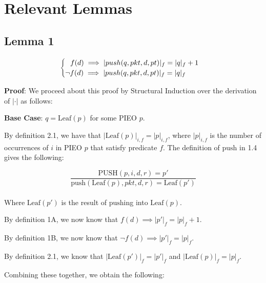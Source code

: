 \documentclass{amsart}
\begin{document}
\section{Relevant Lemmas}

\subsection{Lemma 1}


$$\begin{cases}
    \hspace{0.25cm} \text{$f(d) \implies |push(q, pkt, d, pt)|_f = |q|_f + 1$}\\
    \text{$\neg f(d) \implies |push(q, pkt, d, pt)|_f = |q|_f$}
\end{cases}$$

\textbf{Proof}: We proceed about this proof by Structural Induction over the derivation of $| \cdot |$ as follows:\newline

\textbf{Base Case}: $q = \text{Leaf}(p)$ for some PIEO $p$.\newline

By definition 2.1, we have that $|\text{Leaf}(p)|_{i, f} = |p|_{i, f}$, where $|p|_{i, f}$ is the number of occurrences of $i$ in PIEO $p$ that satisfy predicate $f$. The definition of $\text{push}$ in 1.4 gives the following:\newline

$$\frac{\text{PUSH}(p, i, d, r) = p'}{\text{push}(\text{Leaf}(p), pkt, d, r) = \text{Leaf}(p')}$$\\[-10pt]

Where $\text{Leaf}(p')$ is the result of $\text{push}$ing into $\text{Leaf}(p)$.\newline

By definition 1A, we now know that $f(d) \implies |p'|_f = |p|_f + 1$.\newline

By definition 1B, we now know that $\neg f(d) \implies |p'|_f = |p|_f$.\newline

By definition 2.1, we know that $|\text{Leaf}(p')|_f = |p'|_f$ and $|\text{Leaf}(p)|_f = |p|_f$.\newline

Combining these together, we obtain the following:
\end{document}

